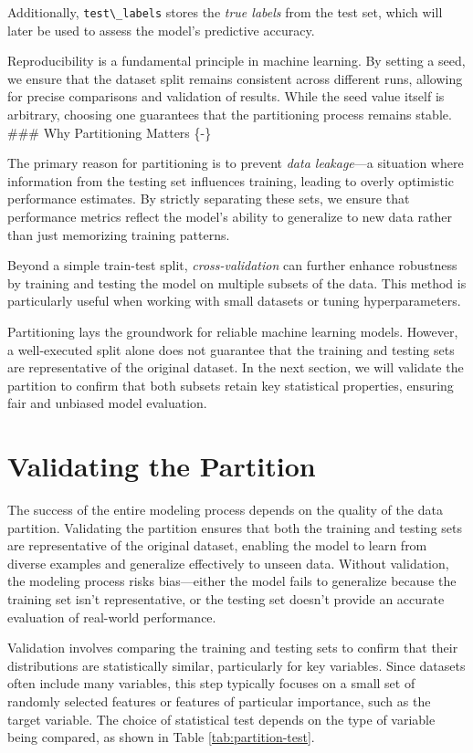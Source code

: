 \documentclass[
  11pt,
]{book}
\newcommand{\passthrough}[1]{#1}
\theoremstyle{definition}
\theoremstyle{definition}
\theoremstyle{definition}
\theoremstyle{definition}
\theoremstyle{remark}
\begin{document}
Additionally, \passthrough{\lstinline!test\_labels!} stores the \emph{true labels} from the test set, which will later be used to assess the model's predictive accuracy.

Reproducibility is a fundamental principle in machine learning. By setting a seed, we ensure that the dataset split remains consistent across different runs, allowing for precise comparisons and validation of results. While the seed value itself is arbitrary, choosing one guarantees that the partitioning process remains stable.\\
\#\#\# Why Partitioning Matters \{-\}

The primary reason for partitioning is to prevent \emph{data leakage}---a situation where information from the testing set influences training, leading to overly optimistic performance estimates. By strictly separating these sets, we ensure that performance metrics reflect the model's ability to generalize to new data rather than just memorizing training patterns.

Beyond a simple train-test split, \emph{cross-validation} can further enhance robustness by training and testing the model on multiple subsets of the data. This method is particularly useful when working with small datasets or tuning hyperparameters.

Partitioning lays the groundwork for reliable machine learning models. However, a well-executed split alone does not guarantee that the training and testing sets are representative of the original dataset. In the next section, we will validate the partition to confirm that both subsets retain key statistical properties, ensuring fair and unbiased model evaluation.

\section{Validating the Partition}\label{sec-validate-partition}

The success of the entire modeling process depends on the quality of the data partition. Validating the partition ensures that both the training and testing sets are representative of the original dataset, enabling the model to learn from diverse examples and generalize effectively to unseen data. Without validation, the modeling process risks bias---either the model fails to generalize because the training set isn't representative, or the testing set doesn't provide an accurate evaluation of real-world performance.

Validation involves comparing the training and testing sets to confirm that their distributions are statistically similar, particularly for key variables. Since datasets often include many variables, this step typically focuses on a small set of randomly selected features or features of particular importance, such as the target variable. The choice of statistical test depends on the type of variable being compared, as shown in Table \ref{tab:partition-test}.
\end{document}

